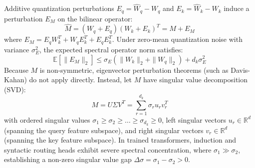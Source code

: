 \documentclass[10pt,twocolumn,letterpaper]{article}
\newcommand{\E}{\mathbb{E}}
\newcommand{\R}{\mathbb{R}}
\begin{document}
Additive quantization perturbations $E_q = \widehat{W}_q - W_q$ and $E_k = \widehat{W}_k - W_k$ induce a perturbation $E_M$ on the bilinear operator:
\begin{equation}
    \widehat{M} = (W_q + E_q)(W_k + E_k)^T = M + E_M
\end{equation}
where $E_M = E_q W_k^T + W_q E_k^T + E_q E_k^T$. Under zero-mean quantization noise with variance $\sigma_E^2$, the expected spectral operator norm satisfies:
\begin{equation}
    \E[\|E_M\|_2] \le \sigma_E \left( \|W_k\|_2 + \|W_q\|_2 \right) + d_k \sigma_E^2
\end{equation}
Because $M$ is non-symmetric, eigenvector perturbation theorems (such as Davis-Kahan) do not apply directly. Instead, let $M$ have singular value decomposition (SVD):
\begin{equation}
    M = U \Sigma V^T = \sum_{r=1}^{d_k} \sigma_r u_r v_r^T
\end{equation}
with ordered singular values $\sigma_1 \ge \sigma_2 \ge \dots \ge \sigma_{d_k} \ge 0$, left singular vectors $u_r \in \R^d$ (spanning the query feature subspace), and right singular vectors $v_r \in \R^d$ (spanning the key feature subspace). In trained transformers, induction and syntactic routing heads exhibit severe spectral concentration, where $\sigma_1 \gg \sigma_2$, establishing a non-zero singular value gap $\Delta \sigma = \sigma_1 - \sigma_2 > 0$.
\end{document}
